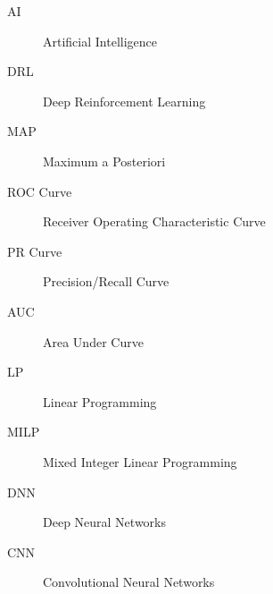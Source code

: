 %
%




\begin{description}
\item[AI]{Artificial Intelligence}
\item[DRL]{Deep Reinforcement Learning}
\item[MAP]{Maximum a Posteriori}
\item[ROC Curve]{Receiver Operating Characteristic Curve}
\item[PR Curve]{Precision/Recall Curve}
\item[AUC]{Area Under Curve}
\item[LP]{Linear Programming}
\item[MILP]{Mixed Integer Linear Programming}
\item[DNN]{Deep Neural Networks}
\item[CNN]{Convolutional Neural Networks}
\end{description}


